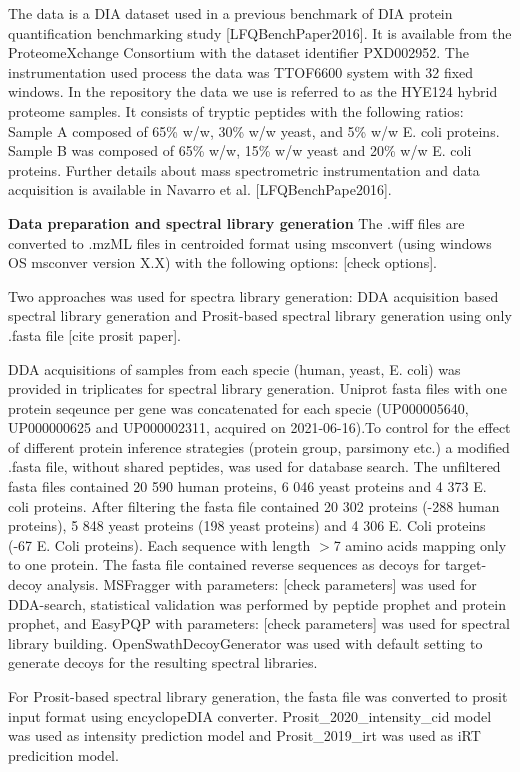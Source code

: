 \documentclass[10pt,letterpaper]{article}
\begin{document}
The data is a DIA dataset used in a previous benchmark of DIA protein quantification benchmarking study [LFQBenchPaper2016]. It is available from the ProteomeXchange Consortium with the dataset identifier PXD002952. The instrumentation used process the data was TTOF6600 system with 32 fixed windows. In the repository the data we use is referred to as the HYE124 hybrid proteome samples. It consists of tryptic peptides with the following ratios: Sample A composed of 65\% w/w, 30\% w/w yeast, and 5\% w/w E. coli proteins. Sample B was composed of 65\% w/w, 15\% w/w yeast and 20\% w/w E. coli proteins. Further details about mass spectrometric instrumentation and data acquisition is available in Navarro et al. [LFQBenchPape2016].     

\textbf{Data preparation and spectral library generation}
The .wiff files are converted to .mzML files in centroided format using msconvert (using windows OS msconver version X.X) with the following options: [check options]. 

Two approaches was used for spectra library generation: DDA acquisition based spectral library generation and Prosit-based spectral library generation using only .fasta file [cite prosit paper]. 

DDA acquisitions of samples from each specie (human, yeast, E. coli) was provided in triplicates for spectral library generation. Uniprot fasta files with one protein seqeunce per gene was concatenated for each specie (UP000005640, UP000000625 and UP000002311, acquired on 2021-06-16).To control for the effect of different protein inference strategies (protein group, parsimony etc.) a modified .fasta file, without shared peptides, was used for database search. The unfiltered fasta files contained 20 590 human proteins, 6 046 yeast proteins and 4 373 E. coli proteins. After filtering the fasta file contained 20 302 proteins (-288 human proteins), 5 848 yeast proteins (198 yeast proteins) and 4 306 E. Coli proteins (-67 E. Coli proteins). Each sequence with length $>$7 amino acids mapping only to one protein. The fasta file contained reverse sequences as decoys for target-decoy analysis. MSFragger with parameters: [check parameters] was used for DDA-search, statistical validation was performed by peptide prophet and protein prophet, and EasyPQP with parameters: [check parameters] was used for spectral library building. OpenSwathDecoyGenerator was used with default setting to generate decoys for the resulting spectral libraries.  

For Prosit-based spectral library generation, the fasta file was converted to prosit input format using encyclopeDIA converter. Prosit\_2020\_intensity\_cid model was used as intensity prediction model and Prosit\_2019\_irt was used as iRT predicition model.  
\end{document}
